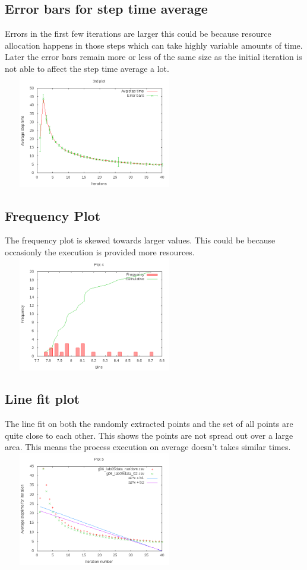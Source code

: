 \documentclass[11pt]{article}
\begin{document}
\subsection{Error bars for step time average}
Errors in the first few iterations are larger this could be because resource allocation happens in those steps which can take highly variable amounts of time. Later the error bars remain more or less of the same size as the initial iteration is not able to affect the step time average a lot. \\ 
\includegraphics[width=8cm,height=5cm]{3k.png} \\
\subsection{Frequency Plot}
The frequency plot is skewed towards larger values. This could be because occasionly the execution is provided more resources. \\
\includegraphics[width=8cm,height=5cm]{4k.png} \\
\subsection{Line fit plot}
The line fit on both the randomly extracted points and the set of all points are quite close to each other. This shows the points are not spread out over a large area. This means the process execution on average doesn't takes similar times. \\
\includegraphics[width=8cm,height=5cm]{5k.png} \\  
\end{document}
